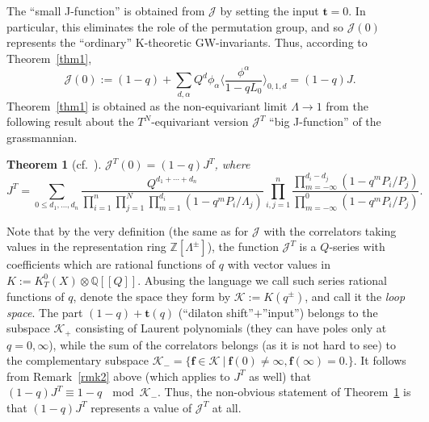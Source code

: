 \documentclass[11pt]{article}
\numberwithin{equation}{section}
\numberwithin{equation}{section}
\newtheorem{Theorem}{Theorem}[section]
\def\K{\mathcal K}
\def\J{\mathcal J}
\def\QQ{\mathbb Q}
\def\ZZ{\mathbb Z}
\def\a{\alpha}
\def\f{{\mathbf f}}
\def\t{{\mathbf t}}
\def\lan{\langle}
\def\ran{\rangle}
\begin{document}
The ``small J-function'' is obtained from $\J$ by setting the input $\t=0$. In particular, this eliminates the role of the permutation group, and so $\J(0)$ represents the ``ordinary'' K-theoretic GW-invariants. Thus, according to Theorem~\ref{thm1},
\[
\J(0):=(1-q)+\sum_{d,\a}Q^d\phi_\a\bigg\lan\frac{\phi^\a}{1-qL_0}\bigg\ran_{0,1,d}=(1-q) J.
\]
Theorem~\ref{thm1} is obtained as the non-equivariant limit $\Lambda\to 1$ from the following result about the $T^N$-equivariant version $\J^T$ ``big J-function'' of the grassmannian.

\begin{Theorem}[{cf.~\cite{Taipale, Wen}}]\label{thm2}
$\J^T(0)=(1-q)J^T$, where
\[
J^T=\sum_{0\leq d_1,\dots,d_n}\frac{Q^{d_1+\cdots+d_n}}{\prod_{i=1}^n\prod_{j=1}^N\prod_{m=1}^{d_i}(1-q^mP_i/\Lambda_j)} \prod_{i,j=1}^n\frac{\prod_{m=-\infty}^{d_i-d_j}(1-q^mP_i/P_j)} {\prod_{m=-\infty}^0(1-q^mP_i/P_j)}.
\]
\end{Theorem}

Note that by the very definition (the same as for $\J$ with the correlators taking values in the representation ring $\ZZ[\Lambda^{\pm}]$), the function $\J^T$ is a $Q$-series with coefficients which are rational functions of $q$ with vector values in $K:=K^0_T(X)\otimes \QQ[[Q]]$. Abusing the language we call such series rational functions of $q$, denote the space they form by $\K:=K(q^{\pm})$, and
call it the {\em loop space}. The part $(1-q)+\t(q)$ (``dilaton shift''$+$''input'') belongs to the subspace $\K_{+}$ consisting of Laurent polynomials (they can have poles only at $q=0,\infty$), while the sum of the correlators belongs (as it is not hard to see) to the complementary subspace $\K_{-}=\{ \f \in \K\ | \ \f(0)\neq \infty, \f(\infty)=0.\}$. It follows from Remark~\ref{rmk2} above (which applies to $J^T$ as well) that $(1-q)J^T\equiv 1-q\ \mod \K_{-}$. Thus, the non-obvious statement of Theorem~\ref{thm2} is that $(1-q)J^T$ represents a value of $\J^T$ at all.
\end{document}
